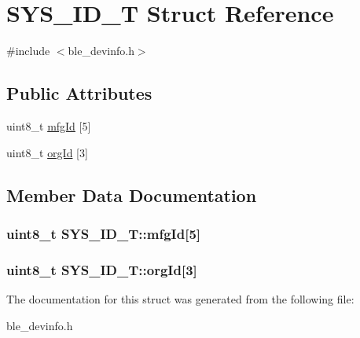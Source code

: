 \hypertarget{struct_s_y_s___i_d___t}{\section{S\-Y\-S\-\_\-\-I\-D\-\_\-\-T Struct Reference}
\label{struct_s_y_s___i_d___t}
}


{\ttfamily \#include $<$ble\-\_\-devinfo.\-h$>$}

\subsection*{Public Attributes}
\begin{DoxyCompactItemize}
\item 
uint8\-\_\-t \hyperlink{struct_s_y_s___i_d___t_a36a75b1bc4c8e4866eb039880b8aad9e}{mfg\-Id} \mbox{[}5\mbox{]}
\item 
uint8\-\_\-t \hyperlink{struct_s_y_s___i_d___t_aaf2c14195d90ec1c9de9b6c57c4fcd94}{org\-Id} \mbox{[}3\mbox{]}
\end{DoxyCompactItemize}


\subsection{Member Data Documentation}
\hypertarget{struct_s_y_s___i_d___t_a36a75b1bc4c8e4866eb039880b8aad9e}{
\subsubsection[{mfg\-Id}]{\setlength{\rightskip}{0pt plus 5cm}uint8\-\_\-t S\-Y\-S\-\_\-\-I\-D\-\_\-\-T\-::mfg\-Id\mbox{[}5\mbox{]}}}\label{struct_s_y_s___i_d___t_a36a75b1bc4c8e4866eb039880b8aad9e}
\hypertarget{struct_s_y_s___i_d___t_aaf2c14195d90ec1c9de9b6c57c4fcd94}{
\subsubsection[{org\-Id}]{\setlength{\rightskip}{0pt plus 5cm}uint8\-\_\-t S\-Y\-S\-\_\-\-I\-D\-\_\-\-T\-::org\-Id\mbox{[}3\mbox{]}}}\label{struct_s_y_s___i_d___t_aaf2c14195d90ec1c9de9b6c57c4fcd94}


The documentation for this struct was generated from the following file\-:\begin{DoxyCompactItemize}
\item 
ble\-\_\-devinfo.\-h\end{DoxyCompactItemize}
